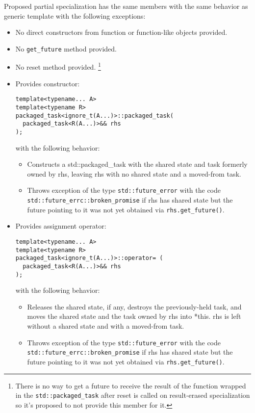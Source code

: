 \documentclass[ebook,openany,10pt,oneside,final]{memoir}
\begin{document}
Proposed partial specialization has the same members with the same behavior as
generic template with the following exceptions:
\begin{itemize}
 \item No direct constructors from function or function-like objects provided.
 \item No \mbox{\texttt{get_future}} method provided.
 \item No reset method provided. \footnote{There is no way to get a future to
receive the result of the function wrapped in the \mbox{\texttt{std::packaged_task}}
after reset is called on result-erased specialization so it's proposed to not
provide this member for it.}
 \item Provides constructor:
 \begin{lstlisting}
template<typename... A>
template<typename R>
packaged_task<ignore_t(A...)>::packaged_task(
  packaged_task<R(A...)>&& rhs
);
 \end{lstlisting}
 with the following behavior:
 \begin{itemize}
  \item Constructs a std::packaged_task with the shared state and task
formerly owned by rhs, leaving rhs with no shared state and a moved-from task.
  \item Throws exception of the type \mbox{\texttt{std::future_error}} with the code
\mbox{\texttt{std::future_errc::broken_promise}} if rhs has shared state but the future
pointing to it was not yet obtained via \mbox{\texttt{rhs.get_future()}}.
 \end{itemize}

 \item Provides assignment operator:
 \begin{lstlisting}
template<typename... A>
template<typename R>
packaged_task<ignore_t(A...)>::operator= (
  packaged_task<R(A...)>&& rhs
);
 \end{lstlisting}
 with the following behavior:
 \begin{itemize}
  \item Releases the shared state, if any, destroys the previously-held task,
and moves the shared state and the task owned by rhs into *this. rhs is left
without a shared state and with a moved-from task.
  \item Throws exception of the type \mbox{\texttt{std::future_error}} with the code
\mbox{\texttt{std::future_errc::broken_promise}} if rhs has shared state but the future
pointing to it was not yet obtained via \mbox{\texttt{rhs.get_future()}}.
 \end{itemize}
\end{itemize}
\end{document}
